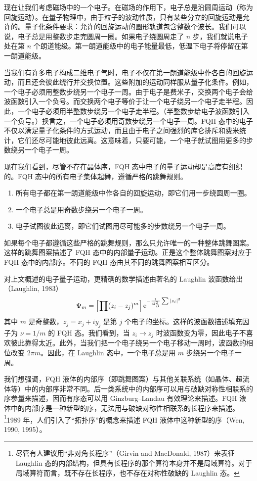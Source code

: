 现在让我们考虑磁场中的一个电子。在磁场的作用下，电子总是沿圆周运动（称为回旋运动）。在量子物理中，由于粒子的波动性质，只有某些分立的回旋运动是允许的。量子化条件要求：允许的回旋运动的圆形轨道包含整数个波长。我们可以说，电子总是用整数步走完圆周一圈。如果电子绕圆周走了 $n$ 步，我们就说电子处在第 $n$ 个朗道能级。第一朗道能级中的电子能量最低，低温下电子将停留在第一朗道能级。

当我们有许多电子构成二维电子气时，电子不仅在第一朗道能级中作各自的回旋运动，而且还会彼此绕行并交换位置。这些附加的运动同样服从量子化条件。例如，一个电子必须用整数步绕另一个电子一周。由于电子是费米子，交换两个电子会给波函数引入一个负号。而交换两个电子等价于让一个电子绕另一个电子走半程。因此，一个电子必须用半整数步绕另一个电子走半程。（半整数步给电子波函数引入一个负号。）换言之，一个电子必须用奇数步绕另一个电子一周。FQH 态中的电子不仅以满足量子化条件的方式运动，而且由于电子之间强烈的库仑排斥和费米统计，它们还尽可能地彼此远离。这意味着，只要可能，一个电子就试图用更多的步数绕另一个电子一周。

现在我们看到，尽管不存在晶体序，FQH 态中电子的量子运动却是高度有组织的。FQH 态中的所有电子集体起舞，遵循严格的跳舞规则。

\begin{enumerate}
\item 所有电子都在第一朗道能级中作各自的回旋运动，即它们用一步绕圆周一圈。
\item 一个电子总是用奇数步绕另一个电子一周。
\item 电子试图彼此远离，即它们试图用尽可能多的步数绕另一个电子一周。
\end{enumerate}

如果每个电子都遵循这些严格的跳舞规则，那么只允许唯一的一种整体跳舞图案。这样的跳舞图案描述了 FQH 态中的内部量子运动。正是这个整体跳舞图案对应于 FQH 态中的内部序。不同的 FQH 态由其不同的跳舞图案相互区分。

对上文概述的电子量子运动，更精确的数学描述由著名的 Laughlin 波函数给出（Laughlin, 1983）
\begin{equation*}
\Psi_m = \Bigl[\prod (z_i - z_j)^m\Bigr]\, \mathrm{e}^{-\frac{1}{4l_B^2}\sum |z_i|^2}
\end{equation*}
其中 $m$ 是奇整数，$z_j = x_j + i y_j$ 是第 $j$ 个电子的坐标。这样的波函数描述填充因子为 $\nu = 1/m$ 的 FQH 态。我们看到，当 $z_i \rightarrow z_j$ 时波函数变为零，因此电子不喜欢彼此靠得太近。此外，当我们把一个电子绕另一个电子移动一周时，波函数的相位改变 $2\pi m$。因此，在 Laughlin 态中，一个电子总是用 $m$ 步绕另一个电子一周。

我们想强调，FQH 液体的内部序（即跳舞图案）与其他关联系统（如晶体、超流体等）中的内部序非常不同。后一类系统中的内部序可以用与破缺对称性相联系的序参量来描述，因而有序态可以用 Ginzburg--Landau 有效理论来描述。FQH 液体中的内部序是一种新型的序，无法用与破缺对称性相联系的长程序来描述。\footnote{尽管有人建议用“非对角长程序”（Girvin and MacDonald, 1987）来表征 Laughlin 态的内部结构，但具有长程序的那个算符本身并不是局域算符。对于局域算符而言，既不存在长程序，也不存在对称性破缺的 Laughlin 态。}1989 年，人们引入了“拓扑序”的概念来描述 FQH 液体中这种新型的序（Wen, 1990, 1995）。

